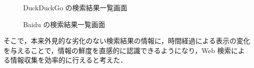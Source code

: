 \begin{figure}[htbp]
  \begin{minipage}{0.5\hsize}
    \begin{center}
    \end{center}
    \caption{DuckDuckGo の検索結果一覧画面}
  \end{minipage}
  \begin{minipage}{0.5\hsize}
    \begin{center}
    \end{center}
    \caption{Baidu の検索結果一覧画面}
  \end{minipage}
\end{figure}

そこで，本来外見的な劣化のない検索結果の情報に，時間経過による表示の変化を与えることで，情報の鮮度を直感的に認識できるようになり，Web 検索による情報収集を効率的に行えると考えた．



